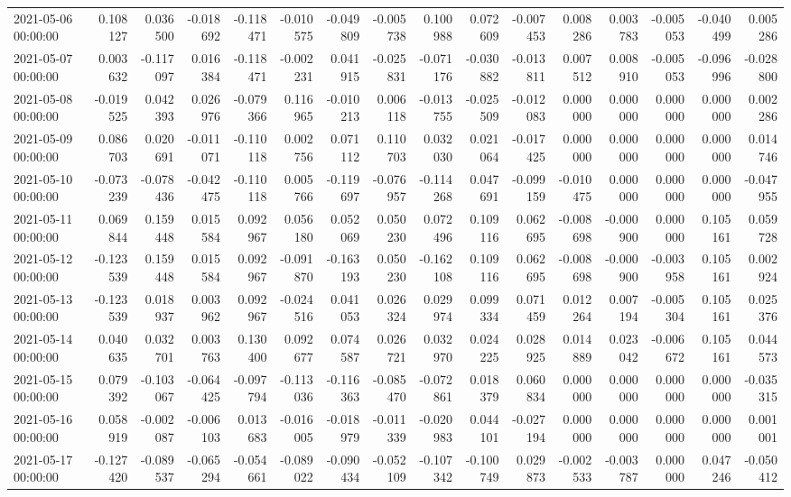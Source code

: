 \begin{tabular}{lrrrrrrrrrrrrrrr}
2021-05-06 00:00:00 & 0.108127 & 0.036500 & -0.018692 & -0.118471 & -0.010575 & -0.049809 & -0.005738 & 0.100988 & 0.072609 & -0.007453 & 0.008286 & 0.003783 & -0.005053 & -0.040499 & 0.005286 \\
2021-05-07 00:00:00 & 0.003632 & -0.117097 & 0.016384 & -0.118471 & -0.002231 & 0.041915 & -0.025831 & -0.071176 & -0.030882 & -0.013811 & 0.007512 & 0.008910 & -0.005053 & -0.096996 & -0.028800 \\
2021-05-08 00:00:00 & -0.019525 & 0.042393 & 0.026976 & -0.079366 & 0.116965 & -0.010213 & 0.006118 & -0.013755 & -0.025509 & -0.012083 & 0.000000 & 0.000000 & 0.000000 & 0.000000 & 0.002286 \\
2021-05-09 00:00:00 & 0.086703 & 0.020691 & -0.011071 & -0.110118 & 0.002756 & 0.071112 & 0.110703 & 0.032030 & 0.021064 & -0.017425 & 0.000000 & 0.000000 & 0.000000 & 0.000000 & 0.014746 \\
2021-05-10 00:00:00 & -0.073239 & -0.078436 & -0.042475 & -0.110118 & 0.005766 & -0.119697 & -0.076957 & -0.114268 & 0.047691 & -0.099159 & -0.010475 & 0.000000 & 0.000000 & 0.000000 & -0.047955 \\
2021-05-11 00:00:00 & 0.069844 & 0.159448 & 0.015584 & 0.092967 & 0.056180 & 0.052069 & 0.050230 & 0.072496 & 0.109116 & 0.062695 & -0.008698 & -0.000900 & 0.000000 & 0.105161 & 0.059728 \\
2021-05-12 00:00:00 & -0.123539 & 0.159448 & 0.015584 & 0.092967 & -0.091870 & -0.163193 & 0.050230 & -0.162108 & 0.109116 & 0.062695 & -0.008698 & -0.000900 & -0.003958 & 0.105161 & 0.002924 \\
2021-05-13 00:00:00 & -0.123539 & 0.018937 & 0.003962 & 0.092967 & -0.024516 & 0.041053 & 0.026324 & 0.029974 & 0.099334 & 0.071459 & 0.012264 & 0.007194 & -0.005304 & 0.105161 & 0.025376 \\
2021-05-14 00:00:00 & 0.040635 & 0.032701 & 0.003763 & 0.130400 & 0.092677 & 0.074587 & 0.026721 & 0.032970 & 0.024225 & 0.028925 & 0.014889 & 0.023042 & -0.006672 & 0.105161 & 0.044573 \\
2021-05-15 00:00:00 & 0.079392 & -0.103067 & -0.064425 & -0.097794 & -0.113036 & -0.116363 & -0.085470 & -0.072861 & 0.018379 & 0.060834 & 0.000000 & 0.000000 & 0.000000 & 0.000000 & -0.035315 \\
2021-05-16 00:00:00 & 0.058919 & -0.002087 & -0.006103 & 0.013683 & -0.016005 & -0.018979 & -0.011339 & -0.020983 & 0.044101 & -0.027194 & 0.000000 & 0.000000 & 0.000000 & 0.000000 & 0.001001 \\
2021-05-17 00:00:00 & -0.127420 & -0.089537 & -0.065294 & -0.054661 & -0.089022 & -0.090434 & -0.052109 & -0.107342 & -0.100749 & 0.029873 & -0.002533 & -0.003787 & 0.000000 & 0.047246 & -0.050412 \\

\end{tabular}
